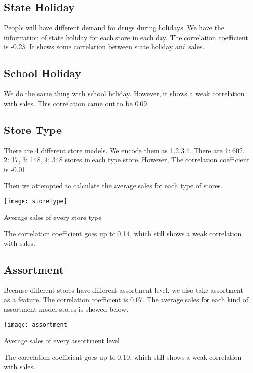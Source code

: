 \documentclass[jou,apacite]{apa6}
\begin{document}
\subsection{State Holiday}
People will have different demand for drugs during holidays. We have the information of state holiday for each store in each day. The correlation coefficient is -0.23. It shows some correlation between state holiday and sales.

\subsection{School Holiday}
We do the same thing with school holiday. However, it shows a weak correlation with sales. This correlation came out to be 0.09.

\subsection{Store Type}
There are 4 different store models. We encode them as 1,2,3,4.
There are 1: 602, 2: 17, 3: 148, 4: 348 stores in each type store. However, The correlation coefficient is -0.01.

Then we attempted to calculate the average sales for each type of stores.

    \begin{center}
    \texttt{[image: storeType]}
    \makeatletter\def\@captype{figure}\makeatother
    \caption{\centering Average sales of every store type}
    \label{storeType}
    \end{center}  

The correlation coefficient goes up to 0.14, which still shows a weak correlation with sales.

\subsection{Assortment}
Because different stores have different assortment level, we also take assortment as a feature. The correlation coefficient is 0.07. The average sales for each kind of assortment model stores is showed below.

    \begin{center}
    \texttt{[image: assortment]}
    \makeatletter\def\@captype{figure}\makeatother
    \caption{\centering Average sales of every assortment level}
    \label{assortment}
    \end{center}  

The correlation coefficient goes up to 0.10, which still shows a weak correlation with sales.
\end{document}
